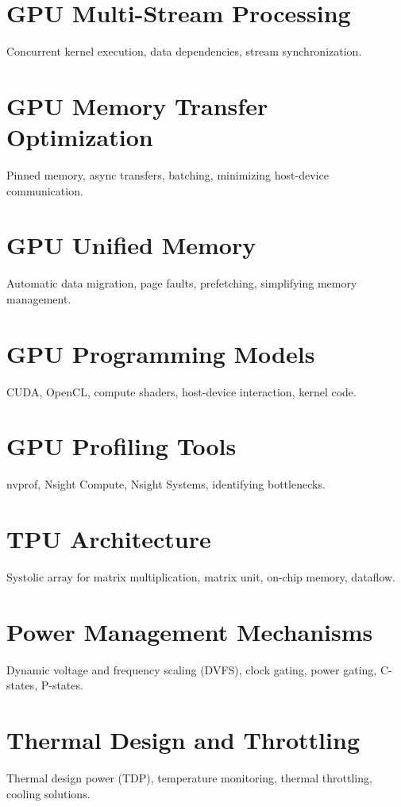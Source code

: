 \chapter{GPU Multi-Stream Processing}
Concurrent kernel execution, data dependencies, stream synchronization.

\chapter{GPU Memory Transfer Optimization}
Pinned memory, async transfers, batching, minimizing host-device communication.

\chapter{GPU Unified Memory}
Automatic data migration, page faults, prefetching, simplifying memory management.

\chapter{GPU Programming Models}
CUDA, OpenCL, compute shaders, host-device interaction, kernel code.

\chapter{GPU Profiling Tools}
nvprof, Nsight Compute, Nsight Systems, identifying bottlenecks.

\chapter{TPU Architecture}
Systolic array for matrix multiplication, matrix unit, on-chip memory, dataflow.


\chapter{Power Management Mechanisms}
Dynamic voltage and frequency scaling (DVFS), clock gating, power gating, C-states, P-states.

\chapter{Thermal Design and Throttling}
Thermal design power (TDP), temperature monitoring, thermal throttling, cooling solutions.

